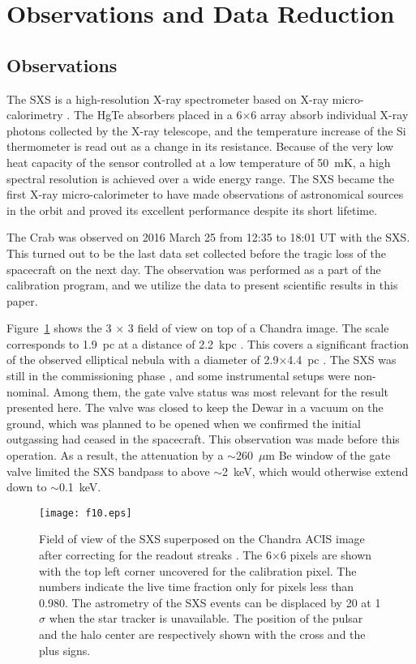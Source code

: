 \documentclass[]{pasj01}
\begin{document}
\section{Observations and Data Reduction}\label{s2}
\subsection{Observations}\label{s2-1}
The SXS is a high-resolution X-ray spectrometer based on X-ray micro-calorimetry
\citep{kelley16}. The HgTe absorbers placed in a 6$\times$6 array absorb individual
X-ray photons collected by the X-ray telescope, and the temperature increase of the Si
thermometer is read out as a change in its resistance. Because of the very low heat
capacity of the sensor controlled at a low temperature of 50~mK, a high spectral
resolution is achieved over a wide energy range. The SXS became the first X-ray
micro-calorimeter to have made observations of astronomical sources in the orbit and
proved its excellent performance despite its short lifetime.

The Crab was observed on 2016 March 25 from 12:35 to 18:01 UT with the SXS. This turned
out to be the last data set collected before the tragic loss of the spacecraft on the
next day. The observation was performed as a part of the calibration program, and we
utilize the data to present scientific results in this paper.

Figure~\ref{f10} shows the 3 $\times$ 3 field of view on top of a Chandra
image. The scale corresponds to 1.9~pc at a distance of 2.2~kpc
\citep{manchester05}. This covers a significant fraction of the observed elliptical
nebula with a diameter of 2.9$\times$4.4~pc \citep{hester08}. The SXS was still in the
commissioning phase \citep{tsujimoto16}, and some instrumental setups were
non-nominal. Among them, the gate valve status was most relevant for the result
presented here. The valve was closed to keep the Dewar in a vacuum on the ground, which
was planned to be opened when we confirmed the initial outgassing had ceased in the
spacecraft. This observation was made before this operation. As a result, the
attenuation by a $\sim$260~$\mu$m Be window of the gate valve \citep{eckart16} limited
the SXS bandpass to above $\sim$2~keV, which would otherwise extend down to
$\sim$0.1~keV. 

\begin{figure}
 \begin{center}
  \texttt{[image: f10.eps]}
 \end{center}
 \vspace*{8mm}
 \caption{Field of view of the SXS superposed on the Chandra ACIS image after correcting for
 the readout streaks \citep{mori04}. The 6$\times$6 pixels are shown with the top left
 corner uncovered for the calibration pixel. The numbers indicate the live time fraction
 only for pixels less than 0.980. The astrometry of the SXS events can be displaced by
 20 at 1 $\sigma$ when the star tracker is unavailable. The position of the
 pulsar \citep{lobanov11} and the halo center \citep{seward06} are respectively shown
 with the cross and the plus signs.}
 \label{f10}
\end{figure}
\end{document}

